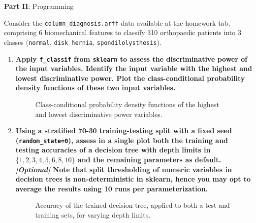 \documentclass[12pt]{article}
\begin{document}
\vskip 0.5cm

\begin{center}
\large{\textbf{Part II}: Programming}\normalsize
\end{center}

\noindent Consider the \texttt{column\_diagnosis.arff} data available at the homework tab, comprising 6 biomechanical
features to classify 310 orthopaedic patients into 3 classes (\texttt{normal}, \texttt{disk hernia}, \texttt{spondilolysthesis}).

\begin{enumerate}[leftmargin=\labelsep]
    \item \textbf{Apply \texttt{f\_classif} from \texttt{sklearn} to assess the discriminative power of the input variables.
          Identify the input variable with the highest and lowest discriminative power.
          Plot the class-conditional probability density functions of these two input variables.}

          \vskip 0.3cm
          

          \vskip -0.8cm
          \begin{figure}[H]
              \centering
              
              \caption{Class-conditional probability density functions of the highest and lowest discriminative power variables.}
              \label{fig:PartII-ex1-plot}
          \end{figure}

    \item \textbf{Using a stratified 70-30 training-testing split with a fixed seed (\texttt{random\_state=0}), assess in a
          single plot both the training and testing accuracies of a decision tree with depth limits in
          $\{1,2,3,4,5,6,8,10\}$ and the remaining parameters as default.\vskip 0.05cm
          \textit{[Optional]} Note that split thresholding of numeric variables in decision trees is non-deterministic
          in sklearn, hence you may opt to average the results using 10 runs per parameterization.}

          \vskip 0.3cm
          

          \vskip -0.8cm
          \begin{figure}[H]
              \centering
              
              \caption{Accuracy of the trained decision tree, applied to both a test and training sets, for varying depth limits.}
              \label{fig:PartII-ex2-plot}
          \end{figure}


\end{enumerate}
\end{document}
